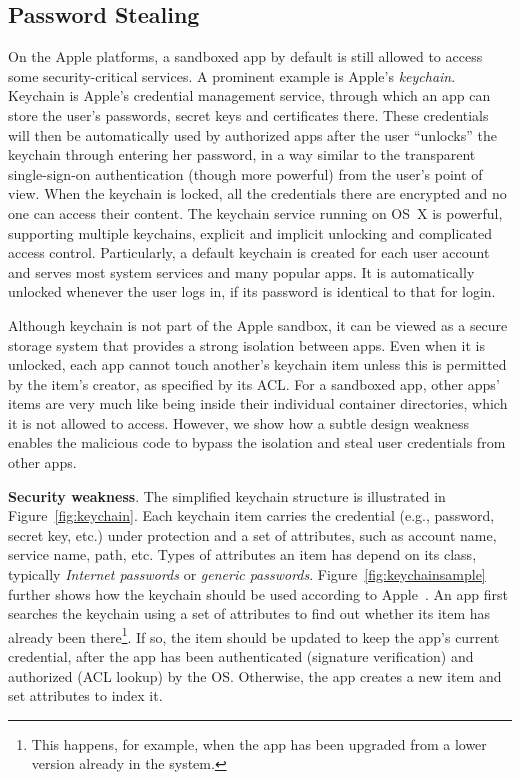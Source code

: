 \documentclass{article}
\newcommand{\ignore}[1]{}
\begin{document}
\subsection{Password Stealing}
\label{subsec:keychain}


On the Apple platforms, a sandboxed app by default is still allowed to access some security-critical services.  A prominent example is Apple's \textit{keychain}. Keychain is Apple's credential management service, through which an app can store the user's passwords, secret keys and certificates there.  These credentials will then be automatically used by authorized apps after the user ``unlocks'' the keychain through entering her password, in a way similar to the transparent single-sign-on authentication (though more powerful) from the user's point of view. When the keychain is locked, all the credentials there are encrypted and no one can access their content. The keychain service running on OS~X is powerful, supporting multiple keychains, explicit and implicit unlocking and complicated access control. Particularly, a default keychain is created for each user account and serves most system services and many popular apps.  It is automatically unlocked whenever the user logs in, if its password is identical to that for login.

Although keychain is not part of the Apple sandbox, it can be viewed as a secure storage system that provides a strong isolation between apps. Even when it is unlocked, each app cannot touch another's keychain item unless this is permitted by the item's creator, as specified by its ACL. For a sandboxed app, other apps' items are very much like being inside their individual container directories, which it is not allowed to access.  However, we show how a subtle design weakness enables the malicious code to bypass the isolation and steal user credentials from other apps.

\vspace {3pt}\noindent\textbf{Security weakness}. The simplified keychain structure is illustrated in Figure~\ref{fig:keychain}. Each keychain item carries the credential (e.g., password, secret key, etc.) under protection and a set of attributes, such as account name, service name, path, etc. Types of attributes an item has depend on its class, typically \textit{Internet passwords} or \textit{generic passwords}.  Figure~\ref{fig:keychainsample} further shows how the keychain should be used according to Apple~\cite{templatecode}. An app first searches the keychain using a set of attributes to find out whether its item has already been there\footnote{\small This happens, for example, when the app has been upgraded from a lower version already in the system.}\ignore{, through the API \texttt{SecKeychainFindInternetPasswo\\rd} or \texttt{SecKeychainFindGenericPassword}}. If so, the item  should be \ignore{is automatically}updated to keep the app's current credential, after the app has been authenticated (signature verification) and authorized (ACL lookup) by the OS. Otherwise, the app \ignore{calls \texttt{SecKeychainA\\ddInternetPassword} or \texttt{SecKeychainAddGenericPass\\word} to create}creates a new item and set attributes to index it.
\end{document}
